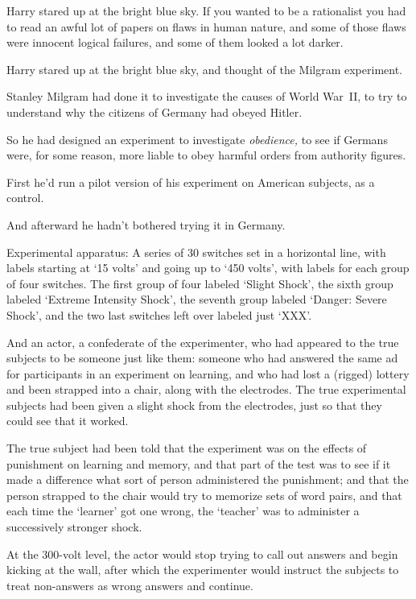 Harry stared up at the bright blue sky. If you wanted to be a rationalist you
had to read an awful lot of papers on flaws in human nature, and some of those
flaws were innocent logical failures, and some of them looked a lot darker.

Harry stared up at the bright blue sky, and thought of the Milgram experiment.

Stanley Milgram had done it to investigate the causes of World War~II, to try
to understand why the citizens of Germany had obeyed Hitler.

So he had designed an experiment to investigate \emph{obedience,} to see if
Germans were, for some reason, more liable to obey harmful orders from
authority figures.

First he'd run a pilot version of his experiment on American subjects, as a
control.

And afterward he hadn't bothered trying it in Germany.

Experimental apparatus: A series of 30 switches set in a horizontal line, with
labels starting at `15 volts' and going up to `450 volts', with labels for each
group of four switches. The first group of four labeled `Slight Shock', the
sixth group labeled `Extreme Intensity Shock', the seventh group labeled
`Danger: Severe Shock', and the two last switches left over labeled just `XXX'.

And an actor, a confederate of the experimenter, who had appeared to the true
subjects to be someone just like them: someone who had answered the same ad for
participants in an experiment on learning, and who had lost a (rigged) lottery
and been strapped into a chair, along with the electrodes. The true
experimental subjects had been given a slight shock from the electrodes, just
so that they could see that it worked.

The true subject had been told that the experiment was on the effects of
punishment on learning and memory, and that part of the test was to see if it
made a difference what sort of person administered the punishment; and that the
person strapped to the chair would try to memorize sets of word pairs, and that
each time the `learner' got one wrong, the `teacher' was to administer a
successively stronger shock.

At the 300-volt level, the actor would stop trying to call out answers and
begin kicking at the wall, after which the experimenter would instruct the
subjects to treat non-answers as wrong answers and continue.

